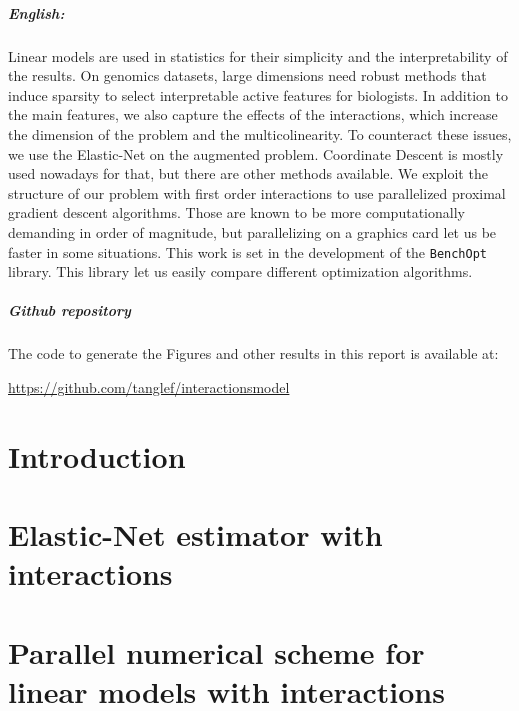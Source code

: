 \documentclass[a4paper, twoside]{memoir}
\begin{document}
\paragraph*{English:}

Linear models are used in statistics for their simplicity and the
interpretability of the results.
On genomics datasets, large dimensions need robust methods that induce sparsity
to select interpretable active features for biologists.
In addition to the main features, we also capture the effects of the interactions,
which increase the dimension of the problem and the multicolinearity.
To counteract these issues, we use the Elastic-Net on the augmented problem.
Coordinate Descent \citep{wu2008coordinate} is mostly used nowadays for that,
but there are other methods available.
We exploit the structure of our problem with first order interactions to
use parallelized proximal gradient descent algorithms.
Those are known to be more computationally demanding in order of magnitude,
but parallelizing on a graphics card let us be faster in some situations.
This work is set in the development of the \texttt{BenchOpt} library.
This library let us easily compare different optimization algorithms.

\paragraph{Github repository}
The code to generate the Figures and other results in this report is available at:
\begin{center}
    \url{https://github.com/tanglef/interactionsmodel}
\end{center}

\newpage
\begin{KeepFromToc}
\tableofcontents
\end{KeepFromToc}

\newpage
{}
\chapter{Introduction}



\chapter{Elastic-Net estimator with interactions}\label{chap:GLM}



\chapter{Parallel numerical scheme for linear models with interactions}
\label{chap:an}

\end{document}

